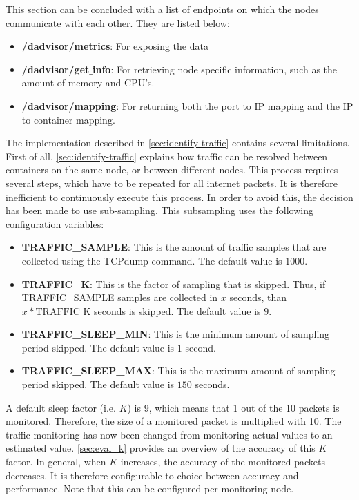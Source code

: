 \noindent
This section can be concluded with a list of endpoints on which the nodes communicate with each other. They are listed below:
\begin{itemize}
    \item \textbf{/dadvisor/metrics}: For exposing the data
    \item \textbf{/dadvisor/get$\_$info}: For retrieving node specific information, such as the amount of memory and CPU's.
    \item \textbf{/dadvisor/mapping}: For returning both the port to IP mapping and the IP to container mapping.
\end{itemize}

\noindent \label{sec:decisions}
The implementation described in \autoref{sec:identify-traffic} contains several limitations. First of all, \autoref{sec:identify-traffic} explains how traffic can be resolved between containers on the same node, or between different nodes. This process requires several steps, which have to be repeated for all internet packets. It is therefore inefficient to continuously execute this process. In order to avoid this, the decision has been made to use sub-sampling. This subsampling uses the following configuration variables:

\begin{itemize}
    \item \textbf{TRAFFIC\_SAMPLE}: This is the amount of traffic samples that are collected using the TCPdump command. The default value is $1000$.
    \item \textbf{TRAFFIC\_K}: This is the factor of sampling that is skipped. Thus, if TRAFFIC\_SAMPLE samples are collected in $x$ seconds, than $x * \text{TRAFFIC\_K}$ seconds is skipped. The default value is $9$.
    \item \textbf{TRAFFIC\_SLEEP\_MIN}: This is the minimum amount of sampling period skipped. The default value is $1$ second.
    \item \textbf{TRAFFIC\_SLEEP\_MAX}: This is the maximum amount of sampling period skipped. The default value is $150$ seconds.
\end{itemize}

\noindent
A default sleep factor (i.e. $K$) is 9, which means that 1 out of the 10 packets is monitored. Therefore, the size of a monitored packet is multiplied with 10. The traffic monitoring has now been changed from monitoring actual values to an estimated value. \autoref{sec:eval_k} provides an overview of the accuracy of this $K$ factor. In general, when $K$ increases, the accuracy of the monitored packets decreases. It is therefore configurable to choice between accuracy and performance. Note that this can be configured per monitoring node.\\

